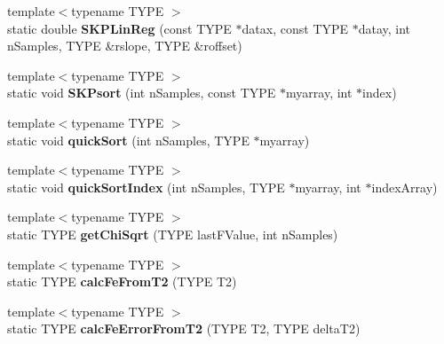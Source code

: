 \begin{DoxyCompactItemize}
\item 
{\footnotesize template$<$typename T\+Y\+PE $>$ }\\static double {\bfseries S\+K\+P\+Lin\+Reg} (const T\+Y\+PE $\ast$datax, const T\+Y\+PE $\ast$datay, int n\+Samples, T\+Y\+PE \&rslope, T\+Y\+PE \&roffset)\hypertarget{class_k_w_util_ac7633e5346a8b4ad6b2d1d960eb22fc9}{}\label{class_k_w_util_ac7633e5346a8b4ad6b2d1d960eb22fc9}

\item 
{\footnotesize template$<$typename T\+Y\+PE $>$ }\\static void {\bfseries S\+K\+Psort} (int n\+Samples, const T\+Y\+PE $\ast$myarray, int $\ast$index)\hypertarget{class_k_w_util_adea3028ddaac44e13ab60460b0e50452}{}\label{class_k_w_util_adea3028ddaac44e13ab60460b0e50452}

\item 
{\footnotesize template$<$typename T\+Y\+PE $>$ }\\static void {\bfseries quick\+Sort} (int n\+Samples, T\+Y\+PE $\ast$myarray)\hypertarget{class_k_w_util_aacc2b444dd10145dea4367714527efa9}{}\label{class_k_w_util_aacc2b444dd10145dea4367714527efa9}

\item 
{\footnotesize template$<$typename T\+Y\+PE $>$ }\\static void {\bfseries quick\+Sort\+Index} (int n\+Samples, T\+Y\+PE $\ast$myarray, int $\ast$index\+Array)\hypertarget{class_k_w_util_aba1906d9b0de1262e0ce837b15e8401f}{}\label{class_k_w_util_aba1906d9b0de1262e0ce837b15e8401f}

\item 
{\footnotesize template$<$typename T\+Y\+PE $>$ }\\static T\+Y\+PE {\bfseries get\+Chi\+Sqrt} (T\+Y\+PE last\+F\+Value, int n\+Samples)\hypertarget{class_k_w_util_a2e55b0bcf1bbf1155654b748a7064cbf}{}\label{class_k_w_util_a2e55b0bcf1bbf1155654b748a7064cbf}

\item 
{\footnotesize template$<$typename T\+Y\+PE $>$ }\\static T\+Y\+PE {\bfseries calc\+Fe\+From\+T2} (T\+Y\+PE T2)\hypertarget{class_k_w_util_ad1d49b3e38a11d057c679d2f1a000a92}{}\label{class_k_w_util_ad1d49b3e38a11d057c679d2f1a000a92}

\item 
{\footnotesize template$<$typename T\+Y\+PE $>$ }\\static T\+Y\+PE {\bfseries calc\+Fe\+Error\+From\+T2} (T\+Y\+PE T2, T\+Y\+PE delta\+T2)\hypertarget{class_k_w_util_a2c962a209fdc94eefafef2093339cecf}{}\label{class_k_w_util_a2c962a209fdc94eefafef2093339cecf}


\end{DoxyCompactItemize}

